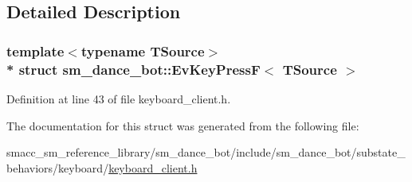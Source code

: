 \subsection{Detailed Description}
\subsubsection*{template$<$typename T\+Source$>$\\*
struct sm\+\_\+dance\+\_\+bot\+::\+Ev\+Key\+Press\+F$<$ T\+Source $>$}



Definition at line 43 of file keyboard\+\_\+client.\+h.



The documentation for this struct was generated from the following file\+:\begin{DoxyCompactItemize}
\item 
smacc\+\_\+sm\+\_\+reference\+\_\+library/sm\+\_\+dance\+\_\+bot/include/sm\+\_\+dance\+\_\+bot/substate\+\_\+behaviors/keyboard/\hyperlink{keyboard__client_8h}{keyboard\+\_\+client.\+h}\end{DoxyCompactItemize}
